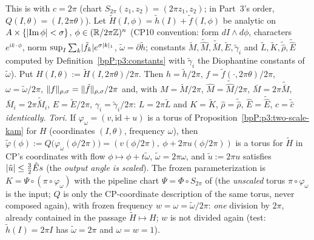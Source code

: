 \begin{lemma}\label{bpP:p3:period-dictionary}
This is  with $c=2\pi$ (chart $S_{2\pi}(z_1,z_2)=(2\pi z_1,z_2)$; in Part~3's order, $Q(I,\theta)=(I,2\pi\theta)$). Let $\tilde H(I,\phi)=\tilde h(I)+\tilde f(I,\phi)$ be analytic on $A\times\{\lvert \operatorname{Im}\phi\rvert<\sigma\}$, $\phi\in(\mathbb{R}/2\pi\mathbb{Z})^n$ (CP10 convention: form $dI\wedge d\phi$, characters $e^{ik\cdot\phi}$, norm $\sup_I\sum_k\lvert \tilde f_k\rvert e^{\sigma\lvert k\rvert_1}$, $\tilde\omega=\partial\tilde h$; constants $\tilde M,\tilde{\hat M},\tilde{\bar M},\tilde E,\tilde\gamma_i$ and $\tilde L,\tilde K,\tilde{\hat\rho},\tilde{\hat E}$ computed by Definition~\ref{bpP:p3:constants} with $\tilde\gamma_i$ the Diophantine constants of $\tilde\omega$).
Put $H(I,\theta):=\tilde H(I,2\pi\theta)/2\pi$. Then $h=\tilde h/2\pi$, $f=\tilde f(\cdot,2\pi\theta)/2\pi$, $\omega=\tilde\omega/2\pi$, $\lVert f\rVert_{\rho,\sigma}=\lVert \tilde f\rVert_{\rho,\sigma}/2\pi$ and, with $M=\tilde M/2\pi$, $\hat M=\tilde{\hat M}/2\pi$, $\bar M=2\pi\tilde{\bar M}$, $\bar M_i=2\pi\tilde{\bar M}_i$, $E=\tilde E/2\pi$, $\gamma_i=\tilde\gamma_i/2\pi$: $L=2\pi\tilde L$ and $K=\tilde K$, $\hat\rho=\tilde{\hat\rho}$, $\hat E=\tilde{\hat E}$, $\hat c=\tilde{\hat c}$ \emph{identically}.
\emph{Tori.} If $\varphi_\omega=(v,\mathrm{id}+u)$ is a torus of Proposition~\ref{bpP:p3:two-scale-kam} for $H$ (coordinates $(I,\theta)$, frequency $\omega$), then
$\tilde\varphi(\phi):=Q\bigl(\varphi_\omega(\phi/2\pi)\bigr)=(v(\phi/2\pi),\ \phi+2\pi u(\phi/2\pi))$ is a torus for $\tilde H$ in CP's coordinates with flow $\phi\mapsto\phi+t\tilde\omega$, $\tilde\omega=2\pi\omega$, and $\tilde u:=2\pi u$ satisfies $\lvert \tilde u\rvert\le\frac32\hat Es$ (the \emph{output angle is scaled}). The frozen parameterization is $K=\Psi\circ(\pi\circ\varphi_\omega)$ with the pipeline chart $\Psi=\Phi\circ S_{2\pi}$ of  (the \emph{unscaled} torus $\pi\circ\varphi_\omega$ is the input; $Q$ is only the CP-coordinate description of the same torus, never composed again), with frozen frequency $w=\omega=\tilde\omega/2\pi$: \emph{one} division by $2\pi$, already contained in the passage $\tilde H\mapsto H$; $w$ is not divided again (test: $\tilde h(I)=2\pi I$ has $\tilde\omega=2\pi$ and $\omega=w=1$).
\end{lemma}
